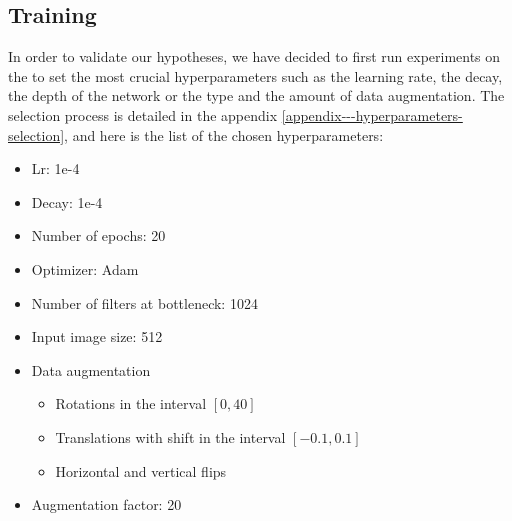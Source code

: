 \subsection{Training}\label{sem-seg-training}

In order to validate our hypotheses, we have decided to first run
experiments on the  to set the most crucial hyperparameters
such as the learning rate, the decay, the depth of the network or the
type and the amount of data augmentation.
The selection process is detailed in the appendix \ref{appendix---hyperparameters-selection}, and here is the list of the chosen hyperparameters:

\begin{itemize}
	\item Lr: 1e-4
	\item Decay: 1e-4
	\item Number of epochs: 20
	\item Optimizer: Adam
	\item Number of filters at bottleneck: 1024
	\item Input image size: 512
	\item Data augmentation
	\begin{itemize}
		\item Rotations in the interval $ \left[0, 40\right] $
		\item Translations with shift in the interval $ \left[-0.1, 0.1\right] $
		\item Horizontal and vertical flips
	\end{itemize}
	\item Augmentation factor: 20
\end{itemize}

